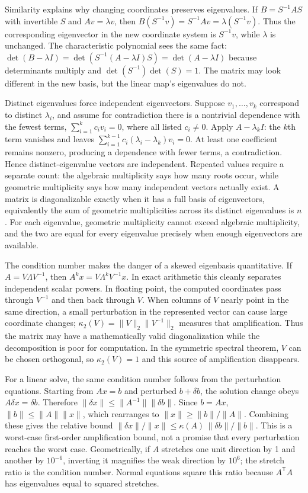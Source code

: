 Similarity explains why changing coordinates preserves eigenvalues. If \(B=S^{-1}AS\) with invertible \(S\) and \(Av=\lambda v\), then \(B(S^{-1}v)=S^{-1}Av=\lambda(S^{-1}v)\). Thus the corresponding eigenvector in the new coordinate system is \(S^{-1}v\), while \(\lambda\) is unchanged. The characteristic polynomial sees the same fact: \(\det(B-\lambda I)=\det(S^{-1}(A-\lambda I)S)=\det(A-\lambda I)\) because determinants multiply and \(\det(S^{-1})\det(S)=1\). The matrix may look different in the new basis, but the linear map's eigenvalues do not.

Distinct eigenvalues force independent eigenvectors. Suppose \(v_1,\ldots,v_k\) correspond to distinct \(\lambda_i\), and assume for contradiction there is a nontrivial dependence with the fewest terms, \(\sum_{i=1}^k c_iv_i=0\), where all listed \(c_i\ne0\). Apply \(A-\lambda_kI\): the \(k\)th term vanishes and leaves \(\sum_{i=1}^{k-1}c_i(\lambda_i-\lambda_k)v_i=0\). At least one coefficient remains nonzero, producing a dependence with fewer terms, a contradiction. Hence distinct-eigenvalue vectors are independent. Repeated values require a separate count: the algebraic multiplicity says how many roots occur, while geometric multiplicity says how many independent vectors actually exist. A matrix is diagonalizable exactly when it has a full basis of eigenvectors, equivalently the sum of geometric multiplicities across its distinct eigenvalues is \(n\). For each eigenvalue, geometric multiplicity cannot exceed algebraic multiplicity, and the two are equal for every eigenvalue precisely when enough eigenvectors are available.

The condition number makes the danger of a skewed eigenbasis quantitative. If \(A=V\Lambda V^{-1}\), then \(A^kx=V\Lambda^kV^{-1}x\). In exact arithmetic this cleanly separates independent scalar powers. In floating point, the computed coordinates pass through \(V^{-1}\) and then back through \(V\). When columns of \(V\) nearly point in the same direction, a small perturbation in the represented vector can cause large coordinate changes; \(\kappa_2(V)=\|V\|_2\|V^{-1}\|_2\) measures that amplification. Thus the matrix may have a mathematically valid diagonalization while the decomposition is poor for computation. In the symmetric spectral theorem, \(V\) can be chosen orthogonal, so \(\kappa_2(V)=1\) and this source of amplification disappears.

For a linear solve, the same condition number follows from the perturbation equations. Starting from \(Ax=b\) and perturbed \(b+\delta b\), the solution change obeys \(A\delta x=\delta b\). Therefore \(\|\delta x\|\le\|A^{-1}\|\|\delta b\|\). Since \(b=Ax\), \(\|b\|\le\|A\|\|x\|\), which rearranges to \(\|x\|\ge\|b\|/\|A\|\). Combining these gives the relative bound \(\|\delta x\|/\|x\|\le\kappa(A)\,\|\delta b\|/\|b\|\). This is a worst-case first-order amplification bound, not a promise that every perturbation reaches the worst case. Geometrically, if \(A\) stretches one unit direction by 1 and another by \(10^{-6}\), inverting it magnifies the weak direction by \(10^6\); the stretch ratio is the condition number. Normal equations square this ratio because \(A^\mathsf TA\) has eigenvalues equal to squared stretches.

